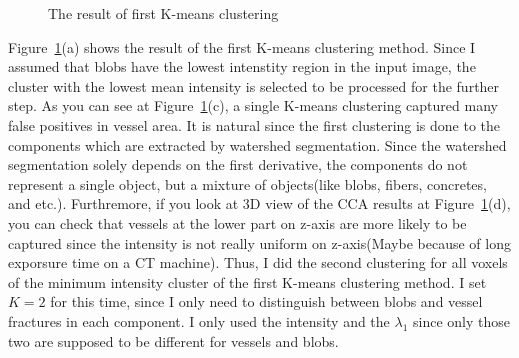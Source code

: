 \documentclass[10pt]{article}
\begin{document}
\begin{figure}[h!tb]
  \centering
  \captionsetup[subfigure]{}
    \hfill
    \hfill
   \hfill
\caption{The result of first K-means clustering}
\label{fig1stK}
\end{figure}

Figure~\ref{fig1stK}(a) shows the result of the first K-means clustering method. Since I assumed that blobs have the lowest intenstity region in the input image,
the cluster with the lowest mean intensity is selected to be processed for the further step. As you can see at Figure~\ref{fig1stK}(c), a single K-means clustering 
captured many false positives in vessel area. It is natural since the first clustering is done to the components which are extracted by watershed segmentation. 
Since the watershed segmentation solely depends on the first derivative, the components do not represent a single object, but a mixture of objects(like blobs, fibers, concretes, and etc.).
Furthremore, if you look at 3D view of the CCA results at Figure~\ref{fig1stK}(d), you can check that vessels at the lower part on z-axis
are more likely to be captured since the intensity is not really uniform on z-axis(Maybe because of long exporsure time on a CT machine).
Thus, I did the second clustering for all voxels of the minimum intensity cluster of the first K-means clustering method. 
I set $K = 2$ for this time, since I only need to distinguish between blobs and vessel fractures in each component. I only used the intensity and the $\lambda_1$ since only those two are supposed to 
be different for vessels and blobs.
\end{document}
